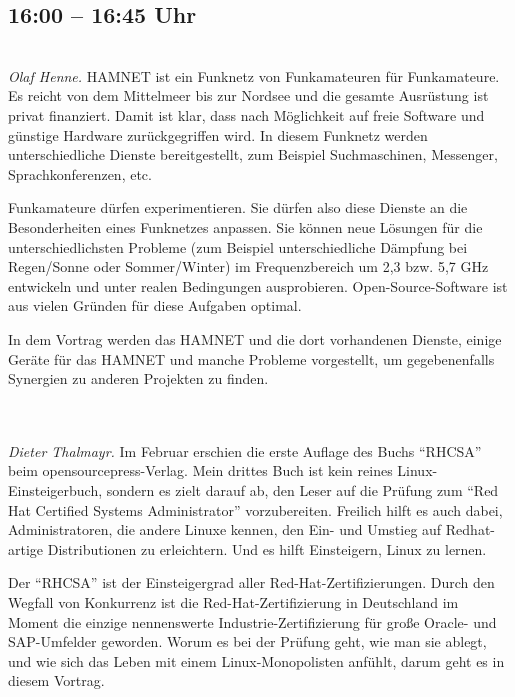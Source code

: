 \documentclass[10pt,a4paper,ngerman,landscape]{scrartcl}
\let\origdescription\description
\renewenvironment{description}{
  \setlength{\leftmargini}{0em}
  \origdescription
  \setlength{\itemindent}{0em}
  \setlength{\itemsep}{1.2em}
  \setlength{\labelsep}{\textwidth}
}
{\endlist}
\newcommand{\vorschub}{\mbox{}\\[-0.5em]}
\begin{document}
\begin{multicols}{3}
\subsection{16:00 -- 16:45 Uhr}

\begin{description}
\item[HAMNET]\vorschub
\textsl{Olaf Henne.}
HAMNET ist ein Funknetz von Funkamateuren für Funkamateure. Es reicht von dem
Mittelmeer bis zur Nordsee und die gesamte Ausrüstung ist privat finanziert.
Damit ist klar, dass nach Möglichkeit auf freie Software und günstige Hardware
zurückgegriffen wird. In diesem Funknetz werden unterschiedliche Dienste
bereitgestellt, zum Beispiel Suchmaschinen, Messenger, Sprachkonferenzen,
etc.

Funkamateure dürfen experimentieren. Sie dürfen also diese Dienste an die
Besonderheiten eines Funknetzes anpassen. Sie können neue Lösungen für die
unterschiedlichsten Probleme (zum Beispiel unterschiedliche Dämpfung bei
Regen/Sonne oder Sommer/Winter) im Frequenzbereich um 2,3 bzw. 5,7 GHz
entwickeln und unter realen Bedingungen ausprobieren. Open-Source-Software ist
aus vielen Gründen für diese Aufgaben optimal.

In dem Vortrag werden das HAMNET und die dort vorhandenen Dienste, einige
Geräte für das HAMNET und manche Probleme vorgestellt, um gegebenenfalls
Synergien zu anderen Projekten zu finden.

\columnbreak
\item[{\parbox[t]{\linewidth}{Buchvorstellung: Red Hat Certified Systems Administrator}}]\vorschub\\
\textsl{Dieter Thalmayr.}
Im Februar erschien die erste Auflage des Buchs "`RHCSA"' beim
opensourcepress-Verlag. Mein drittes Buch ist kein reines Linux-Einsteigerbuch,
sondern es zielt darauf ab, den Leser auf die Prüfung zum "`Red Hat Certified
Systems Administrator"' vorzubereiten. Freilich hilft es auch dabei,
Administratoren, die andere Linuxe kennen, den Ein- und Umstieg auf
Redhat-artige Distributionen zu erleichtern. Und es hilft Einsteigern, Linux zu
lernen.

Der "`RHCSA"' ist der Einsteigergrad aller Red-Hat-Zertifizierungen. Durch
den Wegfall von Konkurrenz ist die Red-Hat-Zertifizierung in Deutschland im
Moment die einzige nennenswerte Industrie-Zertifizierung für große Oracle- und
SAP-Umfelder geworden. Worum es bei der Prüfung geht, wie man sie ablegt, und
wie sich das Leben mit einem Linux-Monopolisten anfühlt, darum geht es in
diesem Vortrag.


\end{description}
\end{multicols}
\end{document}
